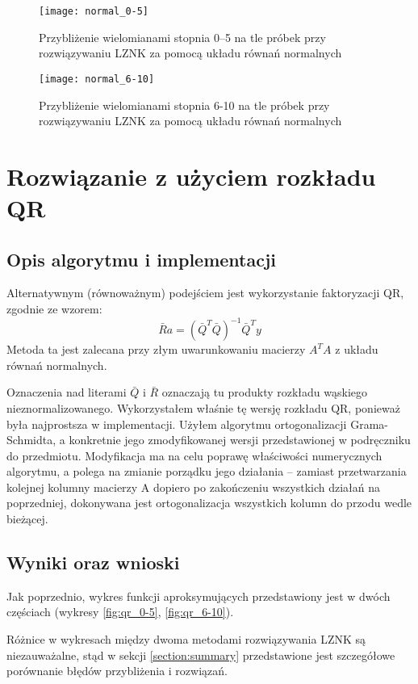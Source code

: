 \documentclass[12pt]{article}
\begin{document}
\begin{figure}[!htbp]
\centering
\texttt{[image: normal\_0-5]}
\centering
\caption{Przybliżenie wielomianami stopnia 0--5 na tle próbek przy rozwiązywaniu LZNK za pomocą układu równań normalnych}
\label{fig:normal_0-5}
\end{figure}
\FloatBarrier

\begin{figure}[!htbp]
\centering
\texttt{[image: normal\_6-10]}
\centering
\caption{Przybliżenie wielomianami stopnia 6-10 na tle próbek przy rozwiązywaniu LZNK za pomocą układu równań normalnych}
\label{fig:normal_6-10}
\end{figure}
\FloatBarrier

\clearpage
\section{Rozwiązanie z użyciem rozkładu QR}

\subsection{Opis algorytmu i implementacji}
Alternatywnym (równoważnym) podejściem jest wykorzystanie faktoryzacji QR, zgodnie ze wzorem:
\[\bar{R}a=(\bar{Q}^{T}\bar{Q})^{-1}\bar{Q}^{T}y\]
Metoda ta jest zalecana przy złym uwarunkowaniu macierzy \(A^{T}A\) z układu równań normalnych.

Oznaczenia nad literami \(\bar{Q}\) i \(\bar{R}\) oznaczają tu produkty rozkładu wąskiego nieznormalizowanego. Wykorzystałem właśnie tę wersję rozkładu QR, ponieważ była najprostsza w implementacji. Użyłem algorytmu ortogonalizacji Grama-Schmidta, a konkretnie jego zmodyfikowanej wersji przedstawionej w podręczniku do przedmiotu. Modyfikacja ma na celu poprawę właściwości numerycznych algorytmu, a polega na zmianie porządku jego działania -- zamiast przetwarzania kolejnej kolumny macierzy A dopiero po zakończeniu wszystkich działań na poprzedniej, dokonywana jest ortogonalizacja wszystkich kolumn do przodu wedle bieżącej.

\subsection{Wyniki oraz wnioski}
Jak poprzednio, wykres funkcji aproksymujących przedstawiony jest w dwóch częściach (wykresy \ref{fig:qr_0-5}, \ref{fig:qr_6-10}).

Różnice w wykresach między dwoma metodami rozwiązywania LZNK są niezauważalne, stąd w sekcji \ref{section:summary} przedstawione jest szczegółowe porównanie błędów przybliżenia i rozwiązań.
\end{document}
